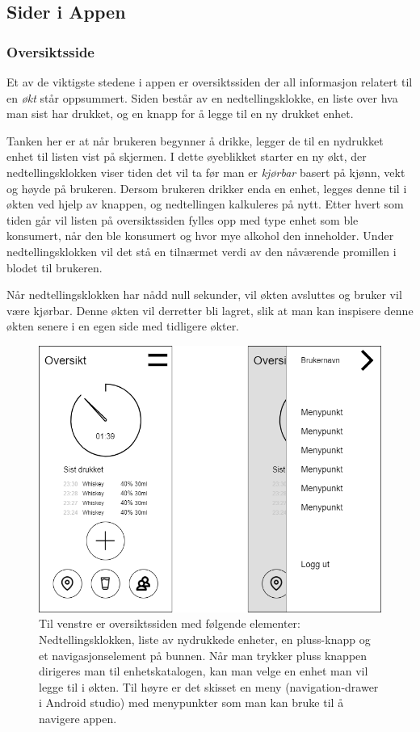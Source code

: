 \subsection{Sider i Appen}
\subsubsection{Oversiktsside}
Et av de viktigste stedene i appen er oversiktssiden der all informasjon relatert til en \textit{økt} står oppsummert. Siden består av en nedtellingsklokke, en liste over hva man sist har drukket, og en knapp for å legge til en ny drukket enhet. 

Tanken her er at når brukeren begynner å drikke, legger de til en nydrukket enhet til listen vist på skjermen. I dette øyeblikket starter en ny økt, der nedtellingsklokken viser tiden det vil ta før man er \textit{kjørbar} basert på kjønn, vekt og høyde på brukeren. Dersom brukeren drikker enda en enhet, legges denne til i økten ved hjelp av knappen, og nedtellingen kalkuleres på nytt. Etter hvert som tiden går vil listen på oversiktssiden fylles opp med type enhet som ble konsumert, når den ble konsumert og hvor mye alkohol den inneholder. Under nedtellingsklokken vil det stå en tilnærmet verdi av den nåværende promillen i blodet til brukeren. 

Når nedtellingsklokken har nådd null sekunder, vil økten avsluttes og bruker vil være kjørbar. Denne økten vil derretter bli lagret, slik at man kan inspisere denne økten senere i en egen side med tidligere økter. 

\begin{figure}[H]
    \centering
    \includegraphics[scale=0.4]{images/lille_promille_frontpage.drawio.png}
    \caption{Til venstre er oversiktssiden med følgende elementer: Nedtellingsklokken, liste av nydrukkede enheter, en pluss-knapp og et navigasjonselement på bunnen. Når man trykker pluss knappen dirigeres man til enhetskatalogen, kan man velge en enhet man vil legge til i økten. Til høyre er det skisset en meny (navigation-drawer i Android studio) med menypunkter som man kan bruke til å navigere appen.}
\end{figure}

